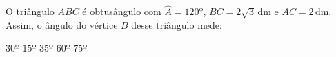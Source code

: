 O tri\^angulo $ABC$ \'e obtus\^angulo com $\hat{A}=120º$, $BC=2\sqrt{3}$\,dm e $AC=2$\,dm. Assim, o \^angulo do v\'ertice $B$ desse tri\^angulo mede:

$30º$
$15º$
$35º$
$60º$
$75º$


